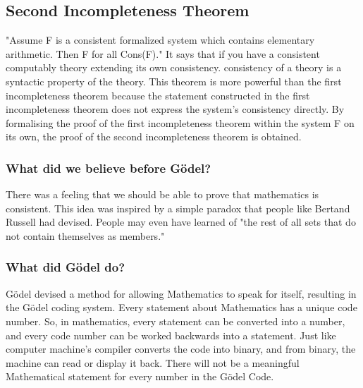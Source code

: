 \documentclass[13pt,letterpaper]{article}
\begin{document}
\subsection* {Second Incompleteness Theorem} "Assume F is a consistent formalized system which contains elementary arithmetic. Then F for all Cons(F)."
It says that if you have a consistent computably theory extending its own consistency. consistency of a theory is a syntactic property of the theory.
This theorem is more powerful than the first incompleteness theorem because the statement constructed in the first incompleteness theorem does not express the system's consistency directly. By formalising the proof of the first incompleteness theorem within the system F on its own, the proof of the second incompleteness theorem is obtained.
\subsubsection* {What did we believe before Gödel?} 
There was a feeling that we should be able to prove that mathematics is consistent. This idea was inspired by a simple paradox that people like Bertand Russell had devised. People may even have learned of "the rest of all sets that do not contain themselves as members."
\subsubsection* {What did Gödel do?}
Gödel devised a method for allowing Mathematics to speak for itself, resulting in the Gödel coding system. Every statement about Mathematics has a unique code number. So, in mathematics, every statement can be converted into a number, and every code number can be worked backwards into a statement. Just like 
computer machine's compiler converts the code into binary, and from binary, the machine can read or display it back.
There will not be a meaningful Mathematical statement for every number in the Gödel Code.
\end{document}
